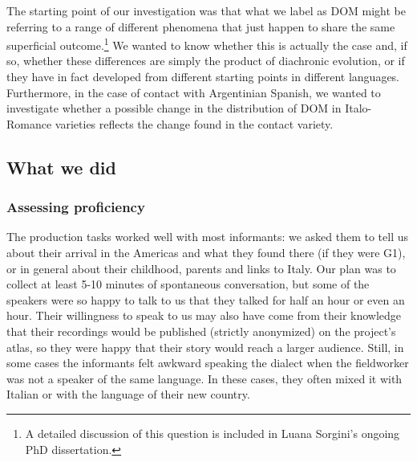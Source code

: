 \documentclass[output=paper,hidelinks]{langscibook}
\begin{document}
The starting point of our investigation was that what we label as DOM might be referring to a range of different phenomena that just happen to share the same superficial outcome.\footnote{A detailed discussion of this question is included in Luana Sorgini’s ongoing PhD dissertation.} We wanted to know whether this is actually the case and, if so, whether these differences are simply the product of diachronic evolution, or if they have in fact developed from different starting points in different languages. Furthermore, in the case of contact with Argentinian Spanish, we wanted to investigate whether a possible change in the distribution of DOM in Italo-Romance varieties reflects the change found in the contact variety. 

\subsection{What we did}\label{sec:andriani:3.2}

\subsubsection{Assessing proficiency}\label{sec:andriani:3.2.1}

The production tasks worked well with most informants: we asked them to tell us about their arrival in the Americas and what they found there (if they were G1), or in general about their childhood, parents and links to Italy. Our plan was to collect at least 5-10 minutes of spontaneous conversation, but some of the speakers were so happy to talk to us that they talked for half an hour or even an hour. Their willingness to speak to us may also have come from their knowledge that their recordings would be published (strictly anonymized) on the project’s atlas, so they were happy that their story would reach a larger audience. Still, in some cases the informants felt awkward speaking the dialect when the fieldworker was not a speaker of the same language. In these cases, they often mixed it with Italian or with the language of their new country.
\end{document}
